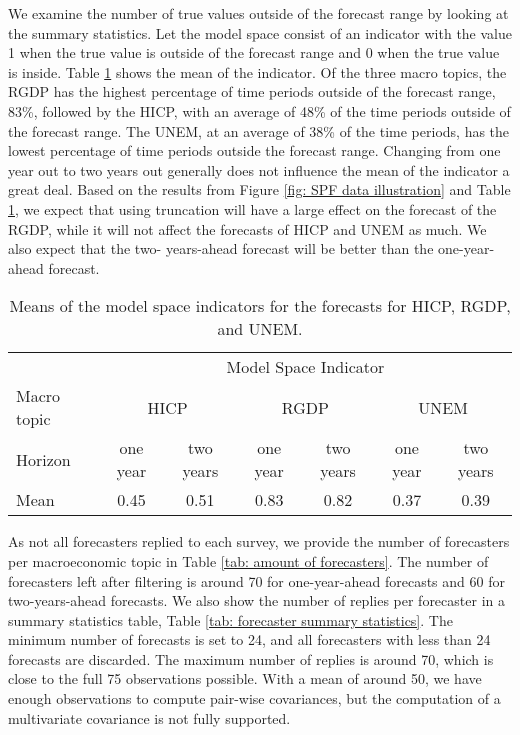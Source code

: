 \documentclass[11pt]{article}
\begin{document}
	We examine the number of true values outside of the forecast range by looking at the summary statistics. Let the model space consist of an indicator with the value 1 when the true value is outside of the forecast range and 0 when the true value is inside. Table \ref{tab: modelspace summary statistics} shows the mean of the indicator. Of the three macro topics, the RGDP has the highest percentage of time periods outside of the forecast range, 83\%, followed by the HICP, with an average of 48\% of the time periods outside of the forecast range. The UNEM, at an average of 38\% of the time periods, has the lowest percentage of time periods outside the forecast range. Changing from one year out to two years out generally does not influence the mean of the indicator a great deal. Based on the results from Figure \ref{fig: SPF data illustration} and Table \ref{tab: modelspace summary statistics}, we expect that using truncation will have a large effect on the forecast of the RGDP, while it will not affect the forecasts of HICP and UNEM as much. We also expect that the two- years-ahead forecast will be better than the one-year-ahead forecast.
	
	\begin{table}[!h]
		\centering
		\caption{Means of the model space indicators for the forecasts for HICP, RGDP, and UNEM.}
		\label{tab: modelspace summary statistics}
		\begin{tabular}{lcccccc}
			\hline
			&\multicolumn{6}{c}{Model Space Indicator}\\
			\cmidrule(lr){2-7}
			Macro topic & \multicolumn{2}{c}{HICP} & \multicolumn{2}{c}{RGDP} & \multicolumn{2}{c}{UNEM} \\
			\cmidrule(lr){2-3} \cmidrule(lr){4-5}\cmidrule(lr){6-7}
			Horizon     & one year & two years & one year & two years & one year & two years \\ 
			\hline
			Mean        & 0.45        & 0.51         & 0.83        & 0.82        & 0.37         & 0.39       \\
			\hline
		\end{tabular}
	\end{table}
	
	As not all forecasters replied to each survey, we provide the number of forecasters per macroeconomic topic in Table \ref{tab: amount of forecasters}. The number of forecasters left after filtering is around 70 for one-year-ahead forecasts and 60 for two-years-ahead forecasts. We also show the number of replies per forecaster in a summary statistics table, Table \ref{tab: forecaster summary statistics}. The minimum number of forecasts is set to 24, and all forecasters with less than 24 forecasts are discarded. The maximum number of replies is around 70, which is close to the full 75 observations possible. With a mean of around 50, we have enough observations to compute pair-wise covariances, but the computation of a multivariate covariance is not fully supported.
	
\end{document}
